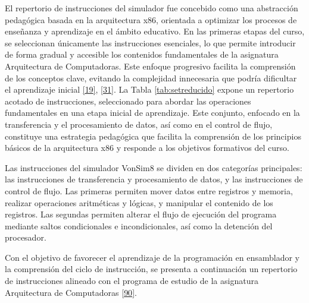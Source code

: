 \documentclass[12pt,oneside]{templates/unerthesis}
\begin{document}
El repertorio de instrucciones del simulador fue concebido como una abstracción pedagógica basada en la arquitectura x86, orientada a optimizar los procesos de enseñanza y aprendizaje en el ámbito educativo. En las primeras etapas del curso, se seleccionan únicamente las instrucciones esenciales, lo que permite introducir de forma gradual y accesible los contenidos fundamentales de la asignatura Arquitectura de Computadoras. Este enfoque progresivo facilita la comprensión de los conceptos clave, evitando la complejidad innecesaria que podría dificultar el aprendizaje inicial \protect\hyperlink{ref-hennessy2017computer}{{[}19{]}}, \protect\hyperlink{ref-tanenbaum_structured_2016}{{[}31{]}}. La Tabla \ref{tab:setreducido} expone un repertorio acotado de instrucciones, seleccionado para abordar las operaciones fundamentales en una etapa inicial de aprendizaje. Este conjunto, enfocado en la transferencia y el procesamiento de datos, así como en el control de flujo, constituye una estrategia pedagógica que facilita la comprensión de los principios básicos de la arquitectura x86 y responde a los objetivos formativos del curso.

Las instrucciones del simulador VonSim8 se dividen en dos categorías principales: las instrucciones de transferencia y procesamiento de datos, y las instrucciones de control de flujo. Las primeras permiten mover datos entre registros y memoria, realizar operaciones aritméticas y lógicas, y manipular el contenido de los registros. Las segundas permiten alterar el flujo de ejecución del programa mediante saltos condicionales e incondicionales, así como la detención del procesador.

Con el objetivo de favorecer el aprendizaje de la programación en ensamblador y la comprensión del ciclo de instrucción, se presenta a continuación un repertorio de instrucciones alineado con el programa de estudio de la asignatura Arquitectura de Computadoras \protect\hyperlink{ref-cd023_25_programa2025}{{[}90{]}}.
\end{document}
